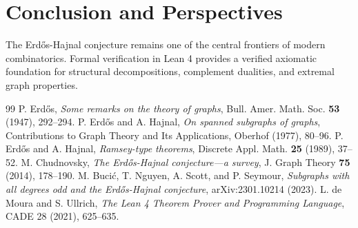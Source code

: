 \documentclass[11pt,a4paper]{article}
\theoremstyle{definition}
\begin{document}
\section{Conclusion and Perspectives}
The Erd\H{o}s-Hajnal conjecture remains one of the central frontiers of modern combinatorics. Formal verification in Lean 4 provides a verified axiomatic foundation for structural decompositions, complement dualities, and extremal graph properties.

\begin{thebibliography}{99}
 P. Erd\H{o}s, \textit{Some remarks on the theory of graphs}, Bull. Amer. Math. Soc. \textbf{53} (1947), 292--294.
 P. Erd\H{o}s and A. Hajnal, \textit{On spanned subgraphs of graphs}, Contributions to Graph Theory and Its Applications, Oberhof (1977), 80--96.
 P. Erd\H{o}s and A. Hajnal, \textit{Ramsey-type theorems}, Discrete Appl. Math. \textbf{25} (1989), 37--52.
 M. Chudnovsky, \textit{The Erd\H{o}s-Hajnal conjecture---a survey}, J. Graph Theory \textbf{75} (2014), 178--190.
 M. Buci\'c, T. Nguyen, A. Scott, and P. Seymour, \textit{Subgraphs with all degrees odd and the Erd\H{o}s-Hajnal conjecture}, arXiv:2301.10214 (2023).
 L. de Moura and S. Ullrich, \textit{The Lean 4 Theorem Prover and Programming Language}, CADE 28 (2021), 625--635.
\end{thebibliography}
\end{document}
